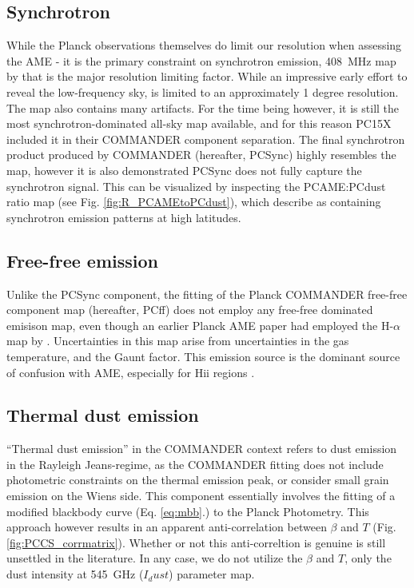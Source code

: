        \subsection{Synchrotron}
        While the Planck observations themselves do limit our resolution when assessing the AME - it is the primary constraint on synchrotron emission, 408~MHz map by \cite{haslam82} that is the major resolution limiting factor. While an impressive early effort to reveal the low-frequency sky, \citep{haslam82} is limited to an approximately 1 degree resolution. The map also contains many artifacts. For the time being however, it is still the most synchrotron-dominated all-sky map available, and for this reason PC15X included it in their COMMANDER component separation. The final synchrotron product produced by COMMANDER (hereafter, PCSync) highly resembles the \citep{haslam82} map, however it is also demonstrated PCSync does not fully capture the synchrotron signal. This can be visualized by inspecting the PCAME:PCdust ratio map (see Fig. \ref{fig:R_PCAMEtoPCdust}), which \cite{hensley16} describe as containing synchrotron emission patterns at high latitudes.


       \subsection{Free-free emission}
        Unlike the PCSync component, the fitting of the Planck COMMANDER free-free component map (hereafter, PCff) does not employ any free-free dominated emisison map, even though an earlier Planck AME paper \citep{planckXV} had employed the H-$\alpha$ map by \cite{wham98}. Uncertainties in this map arise from uncertainties in the gas temperature, and the Gaunt factor. This emission source is the dominant source of confusion with AME, especially for Hii regions \citep{planckXV,planckXII, paladini15}.

      \subsection{Thermal dust emission}
      ``Thermal dust emission'' in the COMMANDER context refers to dust emission in the Rayleigh Jeans-regime, as the COMMANDER fitting does not include photometric constraints on the thermal emission peak, or consider small grain emission on the Wiens side. This component essentially involves the fitting of a modified blackbody curve (Eq. \ref{eq:mbb}.) to the Planck Photometry. This approach however results in an apparent anti-correlation between $\beta$ and $T$ (Fig. \ref{fig:PCCS_corrmatrix}). Whether or not this anti-correltion is genuine is still unsettled in the literature. In any case, we do not utilize the $\beta$ and $T$, only the dust intensity at 545~GHz ($I_dust$) parameter map.

